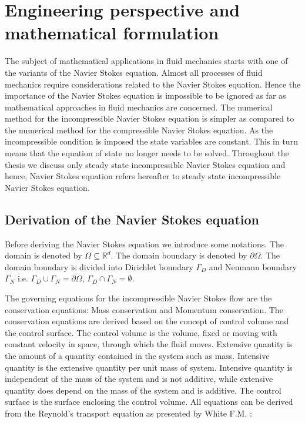 \documentclass[a4paper,openany]{book}
\begin{document}
\newpage

\chapter[Perspective and formulation]{Engineering perspective and mathematical formulation} 

The subject of mathematical applications in fluid mechanics starts with  one of the variants of the Navier Stokes equation. Almost all processes of fluid mechanics require considerations related to the Navier Stokes equation. Hence the importance of the Navier Stokes equation is impossible to be ignored as far as mathematical approaches in fluid mechanics are concerned. The numerical method for the incompressible Navier Stokes equation is simpler as compared to the numerical method for the compressible Navier Stokes equation. As the incompressible condition is imposed the state variables are constant. This in turn means that the equation of state no longer needs to be solved. Throughout the thesis we discuss only steady state incompressible Navier Stokes equation and hence, Navier Stokes equation refers hereafter to steady state incompressible Navier Stokes equation.

\section[Derivation]{Derivation of the Navier Stokes equation}

Before deriving the Navier Stokes equation we introduce some notations. The domain is denoted by $\Omega \subseteq \mathbb{R}^d $. The domain boundary is denoted by $\partial \Omega$. The domain boundary is divided into Dirichlet boundary $\Gamma_D$ and Neumann boundary $\Gamma_N$ i.e. $\Gamma_D \cup \Gamma_N = \partial \Omega $, $\Gamma_D \cap \Gamma_N = \emptyset $. 

The governing equations for the incompressible Navier Stokes flow are the conservation equations: Mass conservation and Momentum conservation. The conservation equations are derived based on the concept of control volume and the control surface. The control volume is the volume, fixed or moving with constant velocity in space, through which the fluid moves. Extensive quantity is the amount of a quantity contained in the system such as mass. Intensive quantity is the extensive quantity per unit mass of system. Intensive quantity is independent of the mass of the system and is not additive, while extensive quantity does depend on the mass of the system and is additive. The control surface is the surface enclosing the control volume. All equations can be derived from the Reynold's transport equation as presented by White F.M. \cite{white}:
\end{document}
